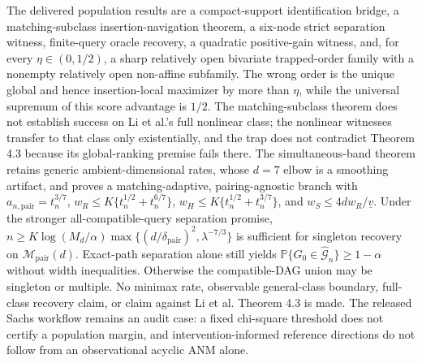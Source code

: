 \documentclass{article}
\begin{document}
The delivered population results are a compact-support identification bridge, a matching-subclass insertion-navigation theorem, a six-node strict separation witness, finite-query oracle recovery, a quadratic positive-gain witness, and, for every \(\eta\in(0,1/2)\), a sharp relatively open bivariate trapped-order family with a nonempty relatively open non-affine subfamily. The wrong order is the unique global and hence insertion-local maximizer by more than \(\eta\), while the universal supremum of this score advantage is \(1/2\). The matching-subclass theorem does not establish success on Li et al.'s full nonlinear class; the nonlinear witnesses transfer to that class only existentially, and the trap does not contradict Theorem 4.3 because its global-ranking premise fails there. The simultaneous-band theorem retains generic ambient-dimensional rates, whose \(d=7\) elbow is a smoothing artifact, and proves a matching-adaptive, pairing-agnostic branch with \(a_{n,\mathrm{pair}}=t_n^{3/7}\), \(w_R\le K\{t_n^{1/2}+t_n^{6/7}\}\), \(w_H\le K\{t_n^{1/2}+t_n^{3/7}\}\), and \(w_S\le4d w_R/\underline v\). Under the stronger all-compatible-query separation promise, \(n\ge K\log(M_d/\alpha)\max\{(d/\delta_{\mathrm{pair}})^2,\lambda^{-7/3}\}\) is sufficient for singleton recovery on \(\mathcal M_{\mathrm{pair}}(d)\). Exact-path separation alone still yields \(\mathbb P\{G_0\in\widehat{\mathcal G}_n\}\ge1-\alpha\) without width inequalities. Otherwise the compatible-DAG union may be singleton or multiple. No minimax rate, observable general-class boundary, full-class recovery claim, or claim against Li et al. Theorem 4.3 is made. The released Sachs workflow remains an audit case: a fixed chi-square threshold does not certify a population margin, and intervention-informed reference directions do not follow from an observational acyclic ANM alone.
\end{document}
